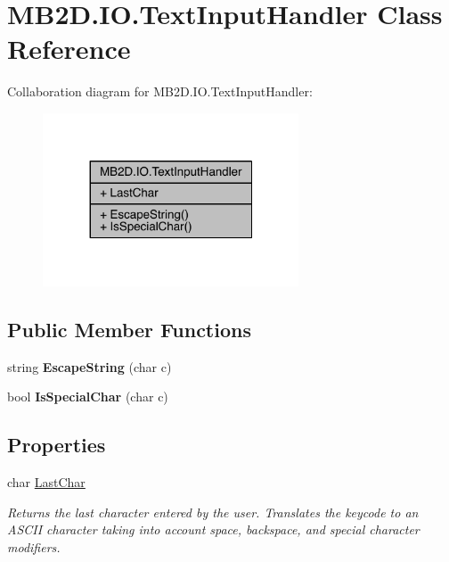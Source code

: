 \hypertarget{class_m_b2_d_1_1_i_o_1_1_text_input_handler}{}\section{M\+B2\+D.\+I\+O.\+Text\+Input\+Handler Class Reference}
\label{class_m_b2_d_1_1_i_o_1_1_text_input_handler}


Collaboration diagram for M\+B2\+D.\+I\+O.\+Text\+Input\+Handler\+:
\nopagebreak
\begin{figure}[H]
\begin{center}
\leavevmode
\includegraphics[width=215pt]{class_m_b2_d_1_1_i_o_1_1_text_input_handler__coll__graph}
\end{center}
\end{figure}
\subsection*{Public Member Functions}
\begin{DoxyCompactItemize}
\item 
\hypertarget{class_m_b2_d_1_1_i_o_1_1_text_input_handler_aebc1a5d52a49c769347ecaae106ff670}{}\label{class_m_b2_d_1_1_i_o_1_1_text_input_handler_aebc1a5d52a49c769347ecaae106ff670} 
string {\bfseries Escape\+String} (char c)
\item 
\hypertarget{class_m_b2_d_1_1_i_o_1_1_text_input_handler_afd04f2a2de624d589acc777c382d1b3c}{}\label{class_m_b2_d_1_1_i_o_1_1_text_input_handler_afd04f2a2de624d589acc777c382d1b3c} 
bool {\bfseries Is\+Special\+Char} (char c)
\end{DoxyCompactItemize}
\subsection*{Properties}
\begin{DoxyCompactItemize}
\item 
char \hyperlink{class_m_b2_d_1_1_i_o_1_1_text_input_handler_a874b0ae4b35ff53064c893e49562dfeb}{Last\+Char}
\begin{DoxyCompactList}\small\item\em Returns the last character entered by the user. Translates the keycode to an A\+S\+C\+II character taking into account space, backspace, and special character modifiers. \end{DoxyCompactList}\end{DoxyCompactItemize}


